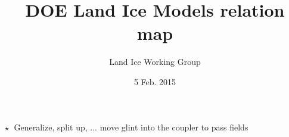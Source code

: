 \documentclass[landscape]{article}
\title{\vspace{-2em}DOE Land Ice Models relation map}
\author{Land Ice Working Group}
\date{5 Feb. 2015}
\begin{document}
    \maketitle
    
    \begin{figure}[h!]
        \centering
        \begin{tikzpicture}[scale=2]
            
        \end{tikzpicture}
    \end{figure}

    \vspace{3em}
    $\star \;$ Generalize, split up, ... move glint into the coupler to pass fields
\end{document}
